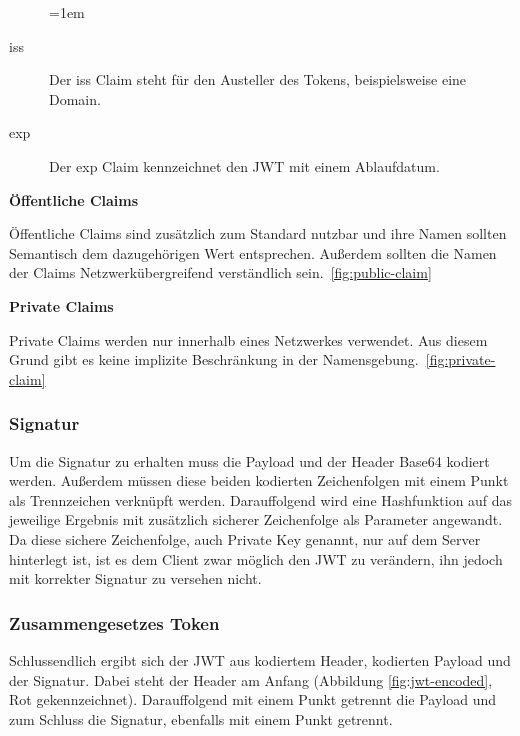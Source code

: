 \begin{description}
	\leftskip=1em
	\item[iss]
	Der iss Claim steht für den Austeller des Tokens, beispielsweise eine Domain.
	\item[exp] Der exp Claim kennzeichnet den \gls{JWT} mit einem Ablaufdatum.
\end{description}

\noindent
\textbf{Öffentliche Claims}

Öffentliche Claims sind zusätzlich zum Standard nutzbar und ihre Namen sollten Semantisch dem dazugehörigen Wert entsprechen. Außerdem sollten die Namen der Claims Netzwerkübergreifend verständlich sein.~\ref{fig:public-claim}

\noindent
\textbf{Private Claims}

Private Claims werden nur innerhalb eines Netzwerkes verwendet. Aus diesem Grund gibt es keine implizite Beschränkung in der Namensgebung.~\ref{fig:private-claim}

\begin{minipage}{\linewidth}
	

	
\end{minipage}

\subsubsection{Signatur}
\label{sec: jwt_signature}

Um die Signatur zu erhalten muss die Payload und der Header Base64 kodiert werden. Außerdem müssen diese beiden kodierten Zeichenfolgen mit einem Punkt als Trennzeichen verknüpft werden. Darauffolgend wird eine Hashfunktion auf das jeweilige Ergebnis mit zusätzlich sicherer Zeichenfolge als Parameter angewandt. Da diese sichere Zeichenfolge, auch Private Key genannt, nur auf dem Server hinterlegt ist, ist es dem Client zwar möglich den \gls{JWT} zu verändern, ihn jedoch mit korrekter Signatur zu versehen nicht.

\subsubsection{Zusammengesetzes Token}
\label{sec: jwt_result}
Schlussendlich ergibt sich der \gls{JWT} aus kodiertem Header, kodierten Payload und der Signatur. Dabei steht der Header am Anfang (Abbildung \ref{fig:jwt-encoded}, Rot gekennzeichnet). Darauffolgend mit einem Punkt getrennt die Payload und zum Schluss die Signatur, ebenfalls mit einem Punkt getrennt.

